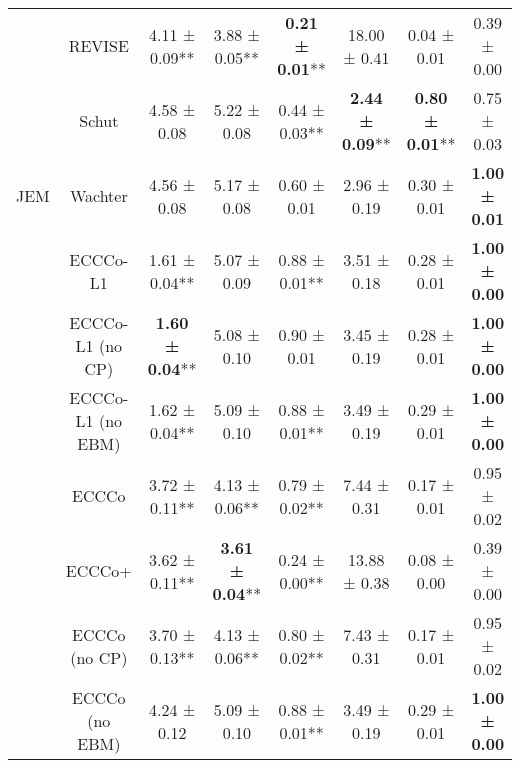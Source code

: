 \begin{table}
{\begin{tabular}[t]{cccccccc}
 & REVISE & 4.11 ± 0.09** & 3.88 ± 0.05** & \textbf{0.21 ± 0.01}** & 18.00 ± 0.41\hphantom{*}\hphantom{*} & 0.04 ± 0.01\hphantom{*}\hphantom{*} & 0.39 ± 0.00\hphantom{*}\hphantom{*}\\

 & Schut & 4.58 ± 0.08\hphantom{*}\hphantom{*} & 5.22 ± 0.08\hphantom{*}\hphantom{*} & 0.44 ± 0.03** & \textbf{2.44 ± 0.09}** & \textbf{0.80 ± 0.01}** & 0.75 ± 0.03\hphantom{*}\hphantom{*}\\

\multirow[t]{-10}{*}{\centering\arraybackslash JEM} & Wachter & 4.56 ± 0.08\hphantom{*}\hphantom{*} & 5.17 ± 0.08\hphantom{*}\hphantom{*} & 0.60 ± 0.01\hphantom{*}\hphantom{*} & 2.96 ± 0.19\hphantom{*}\hphantom{*} & 0.30 ± 0.01\hphantom{*}\hphantom{*} & \textbf{1.00 ± 0.01}\hphantom{*}\hphantom{*}\\
\cmidrule{1-8}
 & ECCCo-L1 & 1.61 ± 0.04** & 5.07 ± 0.09\hphantom{*}\hphantom{*} & 0.88 ± 0.01** & 3.51 ± 0.18\hphantom{*}\hphantom{*} & 0.28 ± 0.01\hphantom{*}\hphantom{*} & \textbf{1.00 ± 0.00}\hphantom{*}\hphantom{*}\\

 & ECCCo-L1 (no CP) & \textbf{1.60 ± 0.04}** & 5.08 ± 0.10\hphantom{*}\hphantom{*} & 0.90 ± 0.01\hphantom{*}\hphantom{*} & 3.45 ± 0.19\hphantom{*}\hphantom{*} & 0.28 ± 0.01\hphantom{*}\hphantom{*} & \textbf{1.00 ± 0.00}\hphantom{*}\hphantom{*}\\

 & ECCCo-L1 (no EBM) & 1.62 ± 0.04** & 5.09 ± 0.10\hphantom{*}\hphantom{*} & 0.88 ± 0.01** & 3.49 ± 0.19\hphantom{*}\hphantom{*} & 0.29 ± 0.01\hphantom{*}\hphantom{*} & \textbf{1.00 ± 0.00}\hphantom{*}\hphantom{*}\\

 & ECCCo & 3.72 ± 0.11** & 4.13 ± 0.06** & 0.79 ± 0.02** & 7.44 ± 0.31\hphantom{*}\hphantom{*} & 0.17 ± 0.01\hphantom{*}\hphantom{*} & 0.95 ± 0.02\hphantom{*}\hphantom{*}\\

 & ECCCo+ & 3.62 ± 0.11** & \textbf{3.61 ± 0.04}** & 0.24 ± 0.00** & 13.88 ± 0.38\hphantom{*}\hphantom{*} & 0.08 ± 0.00\hphantom{*}\hphantom{*} & 0.39 ± 0.00\hphantom{*}\hphantom{*}\\

 & ECCCo (no CP) & 3.70 ± 0.13** & 4.13 ± 0.06** & 0.80 ± 0.02** & 7.43 ± 0.31\hphantom{*}\hphantom{*} & 0.17 ± 0.01\hphantom{*}\hphantom{*} & 0.95 ± 0.02\hphantom{*}\hphantom{*}\\

 & ECCCo (no EBM) & 4.24 ± 0.12\hphantom{*}\hphantom{*} & 5.09 ± 0.10\hphantom{*}\hphantom{*} & 0.88 ± 0.01** & 3.49 ± 0.19\hphantom{*}\hphantom{*} & 0.29 ± 0.01\hphantom{*}\hphantom{*} & \textbf{1.00 ± 0.00}\hphantom{*}\hphantom{*}\\


\end{tabular}}
\end{table}

